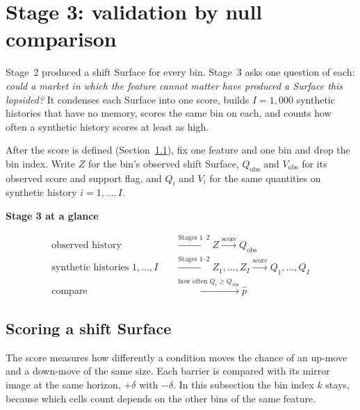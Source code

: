 \documentclass[11pt]{article}
\newenvironment{keyconcept}[1]{%
  \par\addvspace{8pt}\begin{lrbox}{\conceptbox}%
  \begin{minipage}{\dimexpr\linewidth-24pt\relax}%
  \setlength{\parindent}{0pt}%
  {\normalsize\bfseries\color{ConceptInk}#1\par}\large
}{%
  \end{minipage}\end{lrbox}%
  \noindent{\setlength{\fboxsep}{12pt}%
  \colorbox{ConceptPaper}{\usebox{\conceptbox}}}\par\addvspace{8pt}}
\begin{document}
\section{Stage 3: validation by null comparison}\label{sec:validation}

Stage~2 produced a shift Surface for every bin. Stage~3 asks one question
of each: \emph{could a market in which the feature cannot matter have
produced a Surface this lopsided?} It condenses each Surface into one score,
builds $I=1{,}000$ synthetic histories that have no memory, scores the same
bin on each, and counts how often a synthetic history scores at least as high.

After the score is defined (Section~\ref{sec:score}), fix one feature and one
bin and drop the bin index. Write $Z$ for the bin's observed shift Surface,
$Q_{\mathrm{obs}}$ and $V_{\mathrm{obs}}$ for its observed score and support
flag, and $Q_i$ and $V_i$ for the same quantities on synthetic history
$i=1,\ldots,I$.

\begin{keyconcept}{Stage 3 at a glance}
\normalsize
\begin{align*}
 \text{observed history}\quad
   & \xrightarrow{\text{Stages 1--2}}Z
     \xrightarrow{\text{score}}Q_{\mathrm{obs}}\\
 \text{synthetic histories } 1,\ldots,I\quad
   & \xrightarrow{\text{Stages 1--2}}Z_1,\ldots,Z_I
     \xrightarrow{\text{score}}Q_1,\ldots,Q_I\\
 \text{compare}\quad
   & \xrightarrow{\text{how often }Q_i\geq Q_{\mathrm{obs}}}\widehat p
\end{align*}
\end{keyconcept}

\subsection{Scoring a shift Surface}\label{sec:score}

The score measures how differently a condition moves the chance of an
up-move and a down-move of the same size. Each barrier is compared with its
mirror image at the same horizon, $+\delta$ with $-\delta$. In this subsection
the bin index $k$ stays, because which cells count depends on the other bins
of the same feature.
\end{document}
